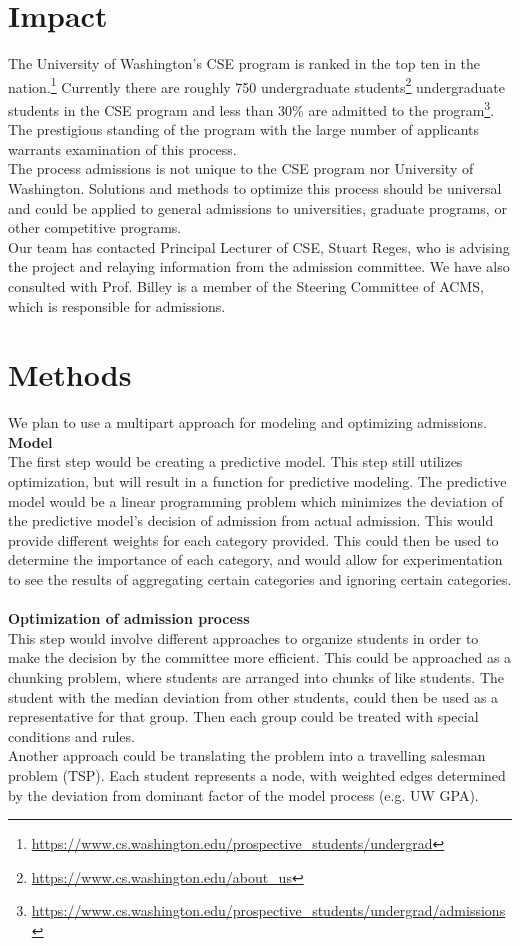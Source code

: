\documentclass[11pt]{article}
\begin{document}
\section{Impact}

The University of Washington's CSE program is ranked in the top ten in the nation.\footnote{\url{https://www.cs.washington.edu/prospective_students/undergrad}} Currently there are roughly 750 undergraduate students\footnote{\url{https://www.cs.washington.edu/about_us}} undergraduate students in the CSE program and less than 30\% are admitted to the program\footnote{\url{https://www.cs.washington.edu/prospective_students/undergrad/admissions}}. The prestigious standing of the program with the large number of applicants warrants examination of this process.
\\
\indent The process admissions is not unique to the CSE program nor University of Washington. Solutions and methods to optimize this process should be universal and could be applied to general admissions to universities, graduate programs, or other competitive programs.
\\
\indent Our team has contacted Principal Lecturer of CSE, Stuart Reges, who is advising the project and relaying information from the admission committee. We have also consulted with Prof. Billey is a member of the Steering Committee of ACMS, which is responsible for admissions.

\section{Methods}

We plan to use a multipart approach for modeling and optimizing admissions. 
\\
\textbf {Model}
\\
The first step would be creating a predictive model. This step still utilizes optimization, but will result in a function for predictive modeling. The predictive model would be a linear programming problem which minimizes the deviation of the predictive model's decision of admission from actual admission. This would provide different weights for each category provided. This could then be used to determine the importance of each category, and would allow for experimentation to see the results of aggregating certain categories and ignoring certain categories.
\\\\
\textbf {Optimization of admission process}
\\
This step would involve different approaches to organize students in order to make the decision by the committee more efficient. This could be approached as a chunking problem, where students are arranged into chunks of like students. The student with the median deviation from other students, could then be used as a representative for that group. Then each group could be treated with special conditions and rules.
\\ \indent Another approach could be translating the problem into a travelling salesman problem (TSP). Each student represents a node, with weighted edges determined by the deviation from dominant factor of the model process (e.g. UW GPA).
\end{document}
